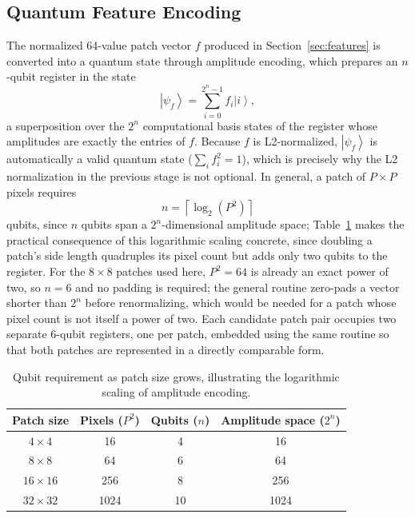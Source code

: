 \documentclass[conference]{IEEEtran}
\newcommand{\ket}[1]{\left|#1\right\rangle}
\begin{document}
\subsection{Quantum Feature Encoding}\label{sec:encoding}
The normalized 64-value patch vector $f$ produced in Section~\ref{sec:features} is converted into a quantum state through amplitude encoding, which prepares an $n$-qubit register in the state
\begin{equation}
\ket{\psi_f} = \sum_{i=0}^{2^n-1} f_i \ket{i},
\label{eq:amp}
\end{equation}
a superposition over the $2^n$ computational basis states of the register whose amplitudes are exactly the entries of $f$. Because $f$ is L2-normalized, $\ket{\psi_f}$ is automatically a valid quantum state ($\sum_i f_i^2 = 1$), which is precisely why the L2 normalization in the previous stage is not optional. In general, a patch of $P\times P$ pixels requires
\begin{equation}
n = \left\lceil \log_2\!\left(P^2\right)\right\rceil
\label{eq:nq}
\end{equation}
qubits, since $n$ qubits span a $2^n$-dimensional amplitude space; Table~\ref{tab:qubits} makes the practical consequence of this logarithmic scaling concrete, since doubling a patch's side length quadruples its pixel count but adds only two qubits to the register. For the $8\times8$ patches used here, $P^2 = 64$ is already an exact power of two, so $n = 6$ and no padding is required; the general routine zero-pads a vector shorter than $2^n$ before renormalizing, which would be needed for a patch whose pixel count is not itself a power of two. Each candidate patch pair occupies two separate 6-qubit registers, one per patch, embedded using the same routine so that both patches are represented in a directly comparable form.

\begin{table}[t]
\centering
\caption{Qubit requirement as patch size grows, illustrating the logarithmic scaling of amplitude encoding.}
\label{tab:qubits}
\begin{tabular}{cccc}
\toprule
\textbf{Patch size} & \textbf{Pixels ($P^2$)} & \textbf{Qubits ($n$)} & \textbf{Amplitude space ($2^n$)}\\
\midrule
$4\times4$ & 16 & 4 & 16\\
$8\times8$ & 64 & 6 & 64\\
$16\times16$ & 256 & 8 & 256\\
$32\times32$ & 1024 & 10 & 1024\\
\bottomrule
\end{tabular}
\end{table}
\end{document}
